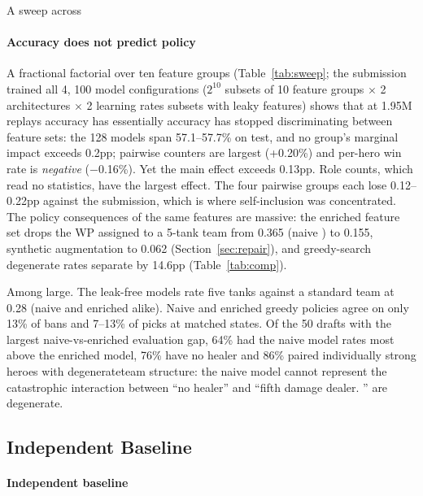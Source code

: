 \documentclass[journal]{IEEEtran}
\providecommand{\DIFaddtex}[1]{{\protect\color{blue} \sf #1}} %
\providecommand{\DIFdeltex}[1]{{\protect\color{red} \scriptsize #1}} %
\providecommand{\DIFaddbegin}{} %
\providecommand{\DIFaddend}{} %
\providecommand{\DIFdelbegin}{} %
\providecommand{\DIFdelend}{} %
\providecommand{\DIFadd}[1]{\texorpdfstring{\DIFaddtex{#1}}{#1}} %
\providecommand{\DIFdel}[1]{\texorpdfstring{\DIFdeltex{#1}}{}} %
\begin{document}
\DIFdelbegin \DIFdel{A sweep across }\DIFdelend \DIFaddbegin \paragraph{\DIFadd{Accuracy does not predict policy}} \DIFadd{A fractional factorial over ten feature groups (Table~\ref{tab:sweep}; the submission trained all }\DIFaddend 4,\DIFdelbegin \DIFdel{100 model configurations ($2^{10}$ subsets of 10 feature groups $\times$ 2 architectures $\times$ 2 learning rates}\DIFdelend \DIFaddbegin \DIFadd{096 subsets with leaky features}\DIFaddend ) shows that \DIFdelbegin \DIFdel{at 1.95M replays accuracy has essentially }\DIFdelend \DIFaddbegin \DIFadd{accuracy has }\DIFaddend stopped discriminating between feature sets: \DIFaddbegin \DIFadd{the 128 models span 57.1--57.7\% on test, and }\DIFaddend no group's \DIFdelbegin \DIFdel{marginal impact exceeds 0.2pp; pairwise counters are largest (+0.20\%) and per-hero win rate is \textit{negative} ($-$0.16\%). Yet the }\DIFdelend \DIFaddbegin \DIFadd{main effect exceeds 0.13pp. Role counts, which read no statistics, have the largest effect. The four pairwise groups each lose 0.12--0.22pp against the submission, which is where self-inclusion was concentrated. The }\DIFaddend policy consequences of the same features are \DIFdelbegin \DIFdel{massive: the enriched feature set drops the WP assigned to a 5-tank team from 0.365 (naive ) to 0.155, synthetic augmentation to 0.062 (Section~\ref{sec:repair}), and greedy-search degenerate rates separate by 14.6pp (Table~\ref{tab:comp}). }%

\DIFdel{Among }\DIFdelend \DIFaddbegin \DIFadd{large. The leak-free models rate five tanks against a standard team at 0.28 (naive and enriched alike). Naive and enriched greedy policies agree on only 13\% of bans and 7--13\% of picks at matched states. Of }\DIFaddend the 50 drafts \DIFdelbegin \DIFdel{with the largest naive-vs-enriched evaluation gap, 64\% had }\DIFdelend \DIFaddbegin \DIFadd{the naive model rates most above the enriched model, 76\% have }\DIFaddend no healer and 86\% \DIFdelbegin \DIFdel{paired individually strong heroes with degenerateteam structure: the naive model cannot represent the catastrophic interaction between ``no healer'' and ``fifth damage dealer.
''
}\DIFdelend \DIFaddbegin \DIFadd{are degenerate.
}\DIFaddend 

\DIFdelbegin \subsection{\DIFdel{Independent Baseline}}
\addtocounter{subsection}{-1}%
\DIFdelend \DIFaddbegin \paragraph{\DIFadd{Independent baseline}}
\DIFaddend \label{sec:gourdeau}
\DIFdelbegin %
\end{document}

